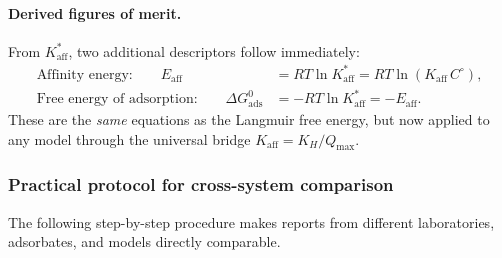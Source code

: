 	\paragraph{Derived figures of merit.}
	From $K_{\mathrm{aff}}^{\ast}$, two additional descriptors follow
	immediately:
	\begin{align}
		\text{Affinity energy:}\qquad
		E_{\mathrm{aff}}
		&= RT\ln K_{\mathrm{aff}}^{\ast}
		= RT\ln(K_{\mathrm{aff}}\, C^\circ),
		\label{eq:Eaff_universal}
		\\[4pt]
		\text{Free energy of adsorption:}\qquad
		\Delta G_{\mathrm{ads}}^{0}
		&= -RT\ln K_{\mathrm{aff}}^{\ast}
		= -E_{\mathrm{aff}}.
		\label{eq:DG_universal}
	\end{align}
	These are the \emph{same} equations as the Langmuir free energy, but
	now applied to any model through the universal bridge
	$K_{\mathrm{aff}} = K_H / Q_{\max}$.

	\subsubsection{Practical protocol for cross-system comparison}

	The following step-by-step procedure makes reports from different
	laboratories, adsorbates, and models directly comparable.

